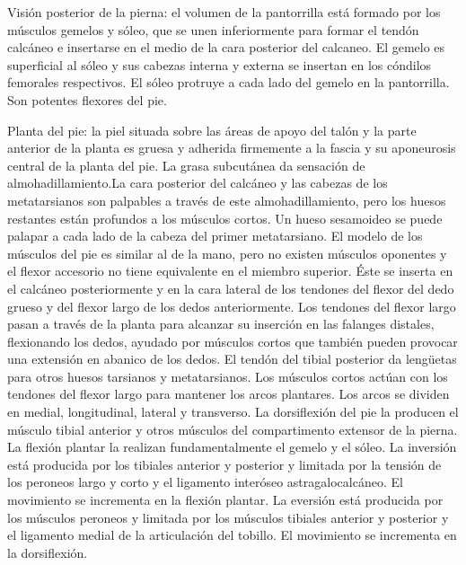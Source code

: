 Visión posterior de la pierna: el volumen de la pantorrilla está formado por los músculos gemelos y sóleo, que se unen inferiormente para formar el tendón calcáneo e insertarse en el medio de la cara posterior del calcaneo. El gemelo es superficial al sóleo y sus cabezas interna y externa se insertan en los cóndilos femorales respectivos. El sóleo protruye a cada lado del gemelo en la pantorrilla. Son potentes flexores del pie.

Planta del pie: la piel situada sobre las áreas de apoyo del talón y la parte anterior de la planta es gruesa y adherida firmemente a la fascia y su aponeurosis central de la planta del pie. La grasa subcutánea da sensación de almohadillamiento.La cara posterior del calcáneo y las cabezas de los metatarsianos son palpables a través de este almohadillamiento, pero los huesos restantes están profundos a los músculos cortos. Un hueso sesamoideo se puede palapar a cada lado de la cabeza del primer metatarsiano. El modelo de los músculos del pie es similar al de la mano, pero no existen músculos oponentes y el flexor accesorio no tiene equivalente en el miembro superior. Éste se inserta en el calcáneo posteriormente y en la cara lateral de los tendones del flexor del dedo grueso y del flexor largo de los dedos anteriormente. Los tendones del flexor largo pasan a través de la planta para alcanzar su inserción en las falanges distales, flexionando los dedos, ayudado por músculos cortos que también pueden provocar una extensión en abanico de los dedos. El tendón del tibial posterior da lengüetas para otros huesos tarsianos y metatarsianos. Los músculos cortos actúan con los tendones del flexor largo para mantener los arcos plantares. Los arcos se dividen en medial, longitudinal, lateral y transverso.
La dorsiflexión del pie la producen el músculo tibial anterior y otros músculos del compartimento extensor de la pierna. La flexión plantar la realizan fundamentalmente el gemelo y el sóleo. La inversión está producida por los tibiales anterior y posterior y limitada por la tensión de los peroneos largo y corto y el ligamento interóseo astragalocalcáneo. El movimiento se incrementa en la flexión plantar. La eversión está producida por los músculos peroneos y limitada por los músculos tibiales anterior y posterior y el ligamento medial de la articulación del tobillo. El movimiento se incrementa en la dorsiflexión.